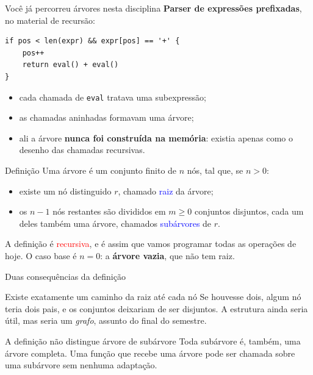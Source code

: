 \documentclass{beamer}
\newcommand{\tcb}[1]{\textcolor{blue}{#1}}
\newcommand{\tcr}[1]{\textcolor{red}{#1}}
\begin{document}
\begin{frame}[fragile]{Você já percorreu árvores nesta disciplina}
  \textbf{Parser de expressões prefixadas}, no material de recursão:

  \begin{verbatim}
if pos < len(expr) && expr[pos] == '+' {
    pos++
    return eval() + eval()
}
  \end{verbatim}

  \vspace{0.3cm}
  \begin{itemize}
    \item cada chamada de \texttt{eval} tratava uma subexpressão;
    \item as chamadas aninhadas formavam uma árvore;
    \item ali a árvore \textbf{nunca foi construída na memória}: existia apenas
          como o desenho das chamadas recursivas.
  \end{itemize}
\end{frame}

\begin{frame}{Definição}
  Uma árvore é um conjunto finito de $n$ nós, tal que, se $n > 0$:

  \begin{itemize}
    \item existe um nó distinguido $r$, chamado \tcb{raiz} da árvore;
    \item os $n-1$ nós restantes são divididos em $m \geq 0$ conjuntos
          disjuntos, cada um deles também uma árvore, chamados \tcb{subárvores}
          de $r$.
  \end{itemize}

  \vspace{0.5cm}
  A definição é \tcr{recursiva}, e é assim que vamos programar todas as
  operações de hoje. O caso base é $n = 0$: a \textbf{árvore vazia}, que não tem
  raiz.
\end{frame}

\begin{frame}{Duas consequências da definição}
  \begin{block}{Existe exatamente um caminho da raiz até cada nó}
    Se houvesse dois, algum nó teria dois pais, e os conjuntos deixariam de ser
    disjuntos. A estrutura ainda seria útil, mas seria um \textit{grafo},
    assunto do final do semestre.
  \end{block}

  \begin{block}{A definição não distingue árvore de subárvore}
    Toda subárvore é, também, uma árvore completa. Uma função que
    recebe uma árvore pode ser chamada sobre uma subárvore sem nenhuma
    adaptação.
  \end{block}
\end{frame}
\end{document}
